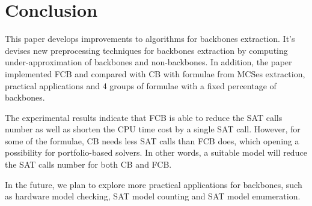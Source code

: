 \section{Conclusion}\label{sec:conc}
This paper develops improvements to algorithms for backbones extraction.
It's devises new preprocessing techniques for backbones extraction by computing under-approximation of backbones and non-backbones.
In addition, the paper implemented FCB and compared with CB with formulae from MCSes extraction, practical applications and 4 groups of formulae with a fixed percentage of backbones.

The experimental results indicate that FCB is able to reduce the SAT calls number as well as shorten the CPU time cost by a single SAT call.
However, for some of the formulae, CB needs less SAT calls than FCB does, which opening a possibility for portfolio-based solvers.
In other words, a suitable model will reduce the SAT calls number for both CB and FCB.

In the future, we plan to explore more practical applications for backbones, such as hardware model checking, SAT model counting and SAT model enumeration.
